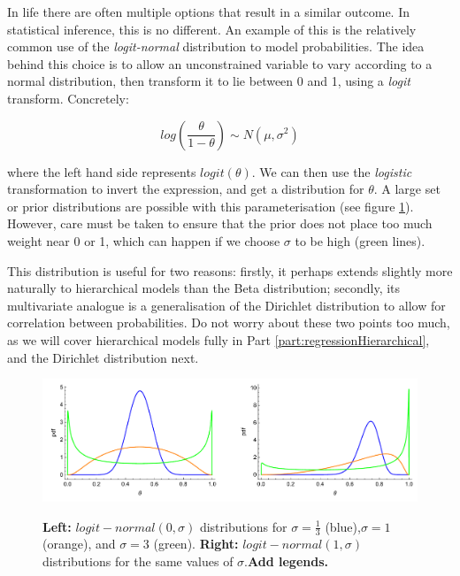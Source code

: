 \documentclass[11pt,fullpage]{book}
\begin{document}
In life there are often multiple options that result in a similar outcome. In statistical inference, this is no different. An example of this is the relatively common use of the \textit{logit-normal} distribution to model probabilities. The idea behind this choice is to allow an unconstrained variable to vary according to a normal distribution, then transform it to lie between 0 and 1, using a \textit{logit} transform. Concretely:

\begin{equation}
log\left(\frac{\theta}{1-\theta}\right) \sim N(\mu,\sigma^2)
\end{equation}

where the left hand side represents $logit(\theta)$. We can then use the \textit{logistic} transformation to invert the expression, and get a distribution for $\theta$. A large set or prior distributions are possible with this parameterisation (see figure \ref{fig:Distributions_logitNormal}). However, care must be taken to ensure that the prior does not place too much weight near 0 or 1, which can happen if we choose $\sigma$ to be high (green lines).

This distribution is useful for two reasons: firstly, it perhaps extends slightly more naturally to hierarchical models than the Beta distribution; secondly, its multivariate analogue is a generalisation of the Dirichlet distribution to allow for correlation between probabilities. Do not worry about these two points too much, as we will cover hierarchical models fully in Part \ref{part:regressionHierarchical}, and the Dirichlet distribution next.  

\begin{figure}
\centering
\scalebox{0.3} 
{\includegraphics{Distributions_logitNormal.pdf}}
\caption{\textbf{Left:} $logit-normal(0,\sigma)$ distributions for $\sigma=\frac{1}{3}$ (blue),$\sigma=1$ (orange), and $\sigma=3$ (green). \textbf{Right:} $logit-normal(1,\sigma)$ distributions for the same values of $\sigma$.\textbf{Add legends.}}\label{fig:Distributions_logitNormal}
\end{figure}
\end{document}
